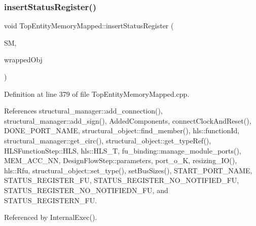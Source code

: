 \subsubsection{\texorpdfstring{insert\+Status\+Register()}{insertStatusRegister()}}
{\footnotesize\ttfamily void Top\+Entity\+Memory\+Mapped\+::insert\+Status\+Register (\begin{DoxyParamCaption}\item[{\hyperlink{structural__manager_8hpp_ab3136f0e785d8535f8d252a7b53db5b5}{structural\+\_\+manager\+Ref}}]{SM,  }\item[{\hyperlink{structural__objects_8hpp_a8ea5f8cc50ab8f4c31e2751074ff60b2}{structural\+\_\+object\+Ref}}]{wrapped\+Obj }\end{DoxyParamCaption})\hspace{0.3cm}{\ttfamily [private]}}



Definition at line 379 of file Top\+Entity\+Memory\+Mapped.\+cpp.



References structural\+\_\+manager\+::add\+\_\+connection(), structural\+\_\+manager\+::add\+\_\+sign(), Added\+Components, connect\+Clock\+And\+Reset(), D\+O\+N\+E\+\_\+\+P\+O\+R\+T\+\_\+\+N\+A\+ME, structural\+\_\+object\+::find\+\_\+member(), hls\+::function\+Id, structural\+\_\+manager\+::get\+\_\+circ(), structural\+\_\+object\+::get\+\_\+type\+Ref(), H\+L\+S\+Function\+Step\+::\+H\+LS, hls\+::\+H\+L\+S\+\_\+T, fu\+\_\+binding\+::manage\+\_\+module\+\_\+ports(), M\+E\+M\+\_\+\+A\+C\+C\+\_\+\+NN, Design\+Flow\+Step\+::parameters, port\+\_\+o\+\_\+K, resizing\+\_\+\+I\+O(), hls\+::\+Rfu, structural\+\_\+object\+::set\+\_\+type(), set\+Bus\+Sizes(), S\+T\+A\+R\+T\+\_\+\+P\+O\+R\+T\+\_\+\+N\+A\+ME, S\+T\+A\+T\+U\+S\+\_\+\+R\+E\+G\+I\+S\+T\+E\+R\+\_\+\+FU, S\+T\+A\+T\+U\+S\+\_\+\+R\+E\+G\+I\+S\+T\+E\+R\+\_\+\+N\+O\+\_\+\+N\+O\+T\+I\+F\+I\+E\+D\+\_\+\+FU, S\+T\+A\+T\+U\+S\+\_\+\+R\+E\+G\+I\+S\+T\+E\+R\+\_\+\+N\+O\+\_\+\+N\+O\+T\+I\+F\+I\+E\+D\+N\+\_\+\+FU, and S\+T\+A\+T\+U\+S\+\_\+\+R\+E\+G\+I\+S\+T\+E\+R\+N\+\_\+\+FU.



Referenced by Internal\+Exec().

